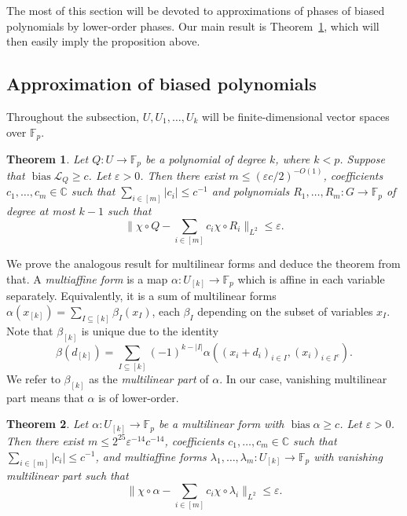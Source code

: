 \documentclass[a4paper,11pt]{article}
\newtheorem{theorem}{Theorem}
\theoremstyle{definition}
\newcommand{\on}[1]{
	\operatorname{#1}
}
\begin{document}
The most of this section will be devoted to approximations of phases of biased polynomials by lower-order phases. Our main result is Theorem~\ref{biased_poly_approx}, which will then easily imply the proposition above.

\subsection{Approximation of biased polynomials}

Throughout the subsection, $U, U_1, \dots, U_k$ will be finite-dimensional vector spaces over $\mathbb{F}_p$.

\begin{theorem}\label{biased_poly_approx}
    Let $Q: U \to \mathbb{F}_p$ be a polynomial of degree $k$, where $k < p$. Suppose that $\on{bias} \mathcal{L}_Q \geq c$. Let $\varepsilon > 0$. Then there exist $m \leq (\varepsilon c/2)^{-O(1)}$, coefficients $c_1, \dots, c_m \in \mathbb{C}$ such that $\sum_{i \in [m]} |c_i| \leq c^{-1}$ and polynomials $R_1, \dots, R_m : G \to \mathbb{F}_p$ of degree at most $k-1$ such that 
    \[\Big\| \chi \circ Q - \sum_{i \in [m]} c_i \chi \circ R_i\Big\|_{L^2} \leq \varepsilon.\]
\end{theorem}

We prove the analogous result for multilinear forms and deduce the theorem from that. A \textit{multiaffine form} is a map $\alpha : U_{[k]} \to \mathbb{F}_p$ which is affine in each variable separately. Equivalently, it is a sum of multilinear forms $\alpha(x_{[k]}) = \sum_{I \subseteq [k]} \beta_I(x_I)$, each $\beta_I$ depending on the subset of variables $x_I$. Note that $\beta_{[k]}$ is unique due to the identity
\[\beta(d_{[k]}) = \sum_{I \subseteq [k]} (-1)^{k - |I|} \alpha((x_i + d_i)_{i \in I}, (x_i)_{i \in I^c}).\]
We refer to $\beta_{[k]}$ as the \textit{multilinear part} of $\alpha$. In our case, vanishing multilinear part means that $\alpha$ is of lower-order.

\begin{theorem}\label{biased_ml_form_approx}
    Let $\alpha : U_{[k]} \to \mathbb{F}_p$ be a multilinear form with $\on{bias}\alpha \geq c$. Let $\varepsilon > 0$. Then there exist
    $m \leq 2^{25}\varepsilon^{-14}c^{-14}$, coefficients $c_1, \dots, c_m \in \mathbb{C}$ such that $\sum_{i \in [m]} |c_i| \leq c^{-1}$, and multiaffine forms $\lambda_1, \dots, \lambda_m : U_{[k]} \to \mathbb{F}_p$ with vanishing multilinear part such that 
    \[\Big\| \chi \circ \alpha - \sum_{i \in [m]} c_i \chi \circ \lambda_i\Big\|_{L^2} \leq \varepsilon.\]
\end{theorem}
\end{document}
